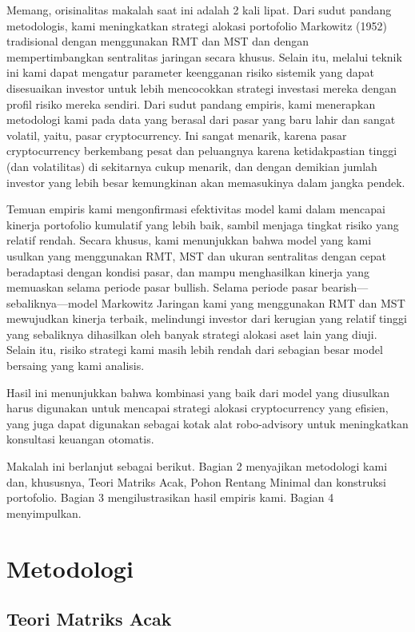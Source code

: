 \documentclass[12pt,a4paper]{article}
\begin{document}
Memang, orisinalitas makalah saat ini adalah 2 kali lipat. Dari sudut pandang metodologis, kami meningkatkan strategi alokasi portofolio Markowitz (1952)\cite{markowitz1952} tradisional dengan menggunakan RMT dan MST dan dengan mempertimbangkan sentralitas jaringan secara khusus. Selain itu, melalui teknik ini kami dapat mengatur parameter keengganan risiko sistemik yang dapat disesuaikan investor untuk lebih mencocokkan strategi investasi mereka dengan profil risiko mereka sendiri. Dari sudut pandang empiris, kami menerapkan metodologi kami pada data yang berasal dari pasar yang baru lahir dan sangat volatil, yaitu, pasar cryptocurrency. Ini sangat menarik, karena pasar cryptocurrency berkembang pesat dan peluangnya karena ketidakpastian tinggi (dan volatilitas) di sekitarnya cukup menarik, dan dengan demikian jumlah investor yang lebih besar kemungkinan akan memasukinya dalam jangka pendek.

Temuan empiris kami mengonfirmasi efektivitas model kami dalam mencapai kinerja portofolio kumulatif yang lebih baik, sambil menjaga tingkat risiko yang relatif rendah. Secara khusus, kami menunjukkan bahwa model yang kami usulkan yang menggunakan RMT, MST dan ukuran sentralitas dengan cepat beradaptasi dengan kondisi pasar, dan mampu menghasilkan kinerja yang memuaskan selama periode pasar bullish. Selama periode pasar bearish—sebaliknya—model Markowitz Jaringan kami yang menggunakan RMT dan MST mewujudkan kinerja terbaik, melindungi investor dari kerugian yang relatif tinggi yang sebaliknya dihasilkan oleh banyak strategi alokasi aset lain yang diuji. Selain itu, risiko strategi kami masih lebih rendah dari sebagian besar model bersaing yang kami analisis.

Hasil ini menunjukkan bahwa kombinasi yang baik dari model yang diusulkan harus digunakan untuk mencapai strategi alokasi cryptocurrency yang efisien, yang juga dapat digunakan sebagai kotak alat robo-advisory untuk meningkatkan konsultasi keuangan otomatis.

Makalah ini berlanjut sebagai berikut. Bagian 2 menyajikan metodologi kami dan, khususnya, Teori Matriks Acak, Pohon Rentang Minimal dan konstruksi portofolio. Bagian 3 mengilustrasikan hasil empiris kami. Bagian 4 menyimpulkan.

\section{Metodologi}

\subsection{Teori Matriks Acak}
\end{document}
